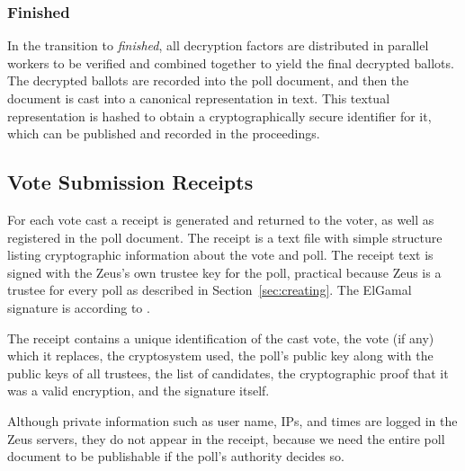 \documentclass[letterpaper,10pt]{article}
\begin{document}
\subsubsection{Finished}
\label{sec:finished}
In the transition to \emph{finished}, all decryption factors are
distributed in parallel workers to be verified and combined together
to yield the final decrypted ballots.
The decrypted ballots are recorded into the poll document,
and then the document is cast into a canonical representation in text.
This textual representation is hashed to obtain a cryptographically
secure identifier for it, which can be published and recorded
in the proceedings.

\subsection{Vote Submission Receipts}
\label{sec:receipts}
For each vote cast a receipt is generated and returned to the voter,
as well as registered in the poll document.
The receipt is a text file with simple structure listing cryptographic
information about the vote and poll.
The receipt text is signed with the Zeus's own trustee key for the
poll, practical because Zeus is a trustee for every poll
as described in Section~\ref{sec:creating}.
The ElGamal signature is according to \cite{schneier:1995}.

The receipt contains a unique identification of the cast vote,
the vote (if any) which it replaces, the cryptosystem used,
the poll's public key along with the public keys of all trustees,
the list of candidates, the cryptographic proof that it was a valid
encryption, and the signature itself.

Although private information such as user name, IPs, and times
are logged in the Zeus servers, they do not appear in the receipt,
because we need the entire poll document to be publishable if
the poll's authority decides so.
\end{document}
